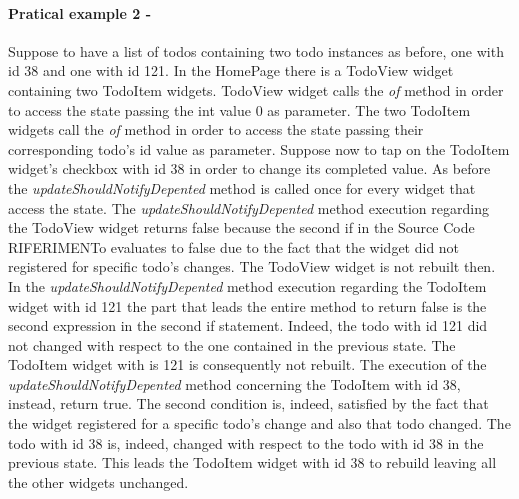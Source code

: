 \paragraph{Pratical example 2 - } 
\label{subpar:todo_updating_feature_inherited_wdiget}
Suppose to have a list of todos containing two todo instances as before, one with id 38 and one with id 121. In the HomePage there is a TodoView widget containing two TodoItem widgets. TodoView widget calls the \textit{of} method in order to access the state passing the int value 0 as parameter. The two TodoItem widgets call the \textit{of} method in order to access the state passing their corresponding todo's id value as parameter. Suppose now to tap on the TodoItem widget's checkbox with id 38 in order to change its completed value. As before the \textit{updateShouldNotifyDepented} method is called once for every widget that access the state. The \textit{updateShouldNotifyDepented} method execution regarding the TodoView widget returns false because the second if in the Source Code RIFERIMENTo evaluates to false due to the fact that the widget did not registered for specific todo's changes. The TodoView widget is not rebuilt then. In the \textit{updateShouldNotifyDepented} method execution regarding the TodoItem widget with id 121 the part that leads the entire method to return false is the second expression in the second if statement. Indeed, the todo with id 121 did not changed with respect to the one contained in the previous state. The TodoItem widget with is 121 is consequently not rebuilt. The execution of the \textit{updateShouldNotifyDepented} method concerning the TodoItem with id 38, instead, return true. The second condition is, indeed, satisfied by the fact that the widget registered for a specific todo's change and also that todo changed. The todo with id 38 is, indeed, changed with respect to the todo with id 38 in the previous state. This leads the TodoItem widget with id 38 to rebuild leaving all the other widgets unchanged.


\mbox{}\\

